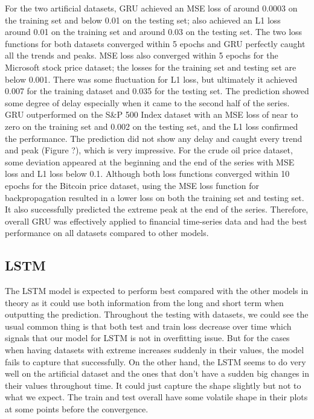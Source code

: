 \documentclass[letterpaper, 10 pt, conference]{ieeeconf}  %
\begin{document}
        For the two artificial datasets, GRU achieved an MSE loss of around 0.0003 on the training set and below 0.01 on the testing set; also achieved an L1 loss around 0.01 on the training set and around 0.03 on the testing set. The two loss functions for both datasets converged within 5 epochs and GRU perfectly caught all the trends and peaks. MSE loss also converged within 5 epochs for the Microsoft stock price dataset; the losses for the training set and testing set are below 0.001. There was some fluctuation for L1 loss, but ultimately it achieved 0.007 for the training dataset and 0.035 for the testing set. The prediction showed some degree of delay especially when it came to the second half of the series. GRU outperformed on the S\&P 500 Index dataset with an MSE loss of near to zero on the training set and 0.002 on the testing set, and the L1 loss confirmed the performance. The prediction did not show any delay and caught every trend and peak (Figure ?), which is very impressive. For the crude oil price dataset, some deviation appeared at the beginning and the end of the series with MSE loss and L1 loss below 0.1. Although both loss functions converged within 10 epochs for the Bitcoin price dataset, using the MSE loss function for backpropagation resulted in a lower loss on both the training set and testing set. It also successfully predicted the extreme peak at the end of the series. Therefore, overall GRU was effectively applied to financial time-series data and had the best performance on all datasets compared to other models.

    \subsection{LSTM}

        The LSTM model is expected to perform best compared with the other models in theory as it could use both information from the long and short term when outputting the prediction. Throughout the testing with datasets, we could see the usual common thing is that both test and train loss decrease over time which signals that our model for LSTM is not in overfitting issue. But for the cases when having datasets with extreme increases suddenly in their values, the model fails to capture that successfully. On the other hand, the LSTM seems to do very well on the artificial dataset and the ones that don’t have a sudden big changes in their values throughout time. It could just capture the shape slightly but not to what we expect. The train and test overall have some volatile shape in their plots at some points before the convergence.
\end{document}
